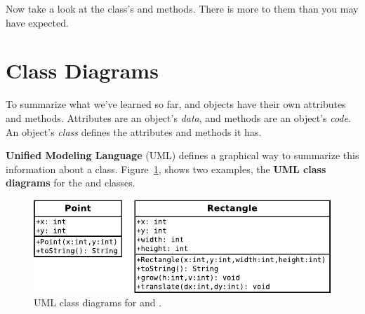 Now take a look at the  class's  and  methods.
There is more to them than you may have expected.







\section{Class Diagrams}
\label{UML}

To summarize what we've learned so far,  and  objects have their own attributes and methods.
Attributes are an object's {\em data}, and methods are an object's {\em code}.
An object's {\em class} defines the attributes and methods it has.


{\bf Unified Modeling Language} (UML) defines a graphical way to summarize this information about a  class.
Figure~\ref{fig.umlPoint}, shows two examples, the {\bf UML class diagrams} for the  and  classes.

\begin{figure}[!ht]
\begin{center}
\includegraphics{figs/point-rect.pdf}
\caption{UML class diagrams for  and .}
\label{fig.umlPoint}
\end{center}
\end{figure}


